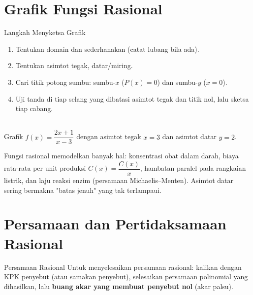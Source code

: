 \documentclass[11pt,a4paper]{report}
\theoremstyle{gaya}
\begin{document}
\section{Grafik Fungsi Rasional}
\begin{konsep}{Langkah Menyketsa Grafik}
\begin{enumerate}[leftmargin=*,topsep=2pt]
  \item Tentukan domain dan sederhanakan (catat lubang bila ada).
  \item Tentukan asimtot tegak, datar/miring.
  \item Cari titik potong sumbu: sumbu-$x$ ($P(x)=0$) dan sumbu-$y$ ($x=0$).
  \item Uji tanda di tiap selang yang dibatasi asimtot tegak dan titik nol, lalu sketsa tiap cabang.
\end{enumerate}
\end{konsep}

\begin{center}
\\
\small Grafik $f(x)=\dfrac{2x+1}{x-3}$ dengan asimtot tegak $x=3$ dan asimtot datar $y=2$.
\end{center}

\begin{dunianyata}
Fungsi rasional memodelkan banyak hal: konsentrasi obat dalam darah, biaya rata-rata per unit produksi $\overline{C}(x)=\dfrac{C(x)}{x}$, hambatan paralel pada rangkaian listrik, dan laju reaksi enzim (persamaan Michaelis--Menten). Asimtot datar sering bermakna "batas jenuh" yang tak terlampaui.
\end{dunianyata}

\section{Persamaan dan Pertidaksamaan Rasional}
\begin{konsep}{Persamaan Rasional}
Untuk menyelesaikan persamaan rasional: kalikan dengan KPK penyebut (atau samakan penyebut), selesaikan persamaan polinomial yang dihasilkan, lalu \textbf{buang akar yang membuat penyebut nol} (akar palsu).
\end{konsep}
\end{document}
